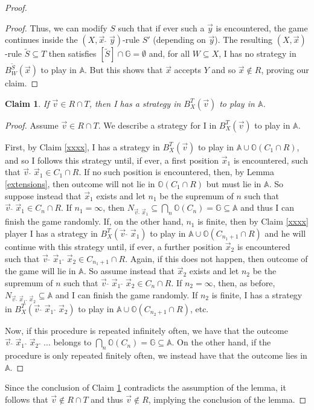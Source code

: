 \documentclass[10pt]{amsart}
\newcommand {\A}{\mathbb A}
\newcommand{\G}{\mathbb G}
\newcommand {\OO}{\mathbb O}
\newcommand{\con}{\;\hat{}\;}
\newcommand{\tom} {\emptyset}
\newtheorem{claim}[thm] {Claim}
\theoremstyle{definition}
\begin{document}
\begin{proof}
\begin{proof}
Thus, we can modify $S$ such that if ever such a $\vec y$ is encountered, the game continues inside the $(X,\vec x\con \vec y)$-rule $S'$ (depending on $\vec y$). The resulting $(X,\vec x)$-rule $\tilde S\subseteq T$
then satisfies $[\tilde S]\cap \G=\tom$ and, for all $W\subseteq X$,  I has no strategy in $B^{\tilde S}_W(\vec x)$ to play in $\A$. But this shows that $\vec x$ accepts $Y$ and so $\vec x\notin R$, proving our claim.
\end{proof}



\begin{claim}\label{xxxxx}
If $\vec v\in R\cap T$, then I has a strategy in $B^T_X(\vec v)$ to play in $\A$.
\end{claim}

\begin{proof}
Assume $\vec v\in R\cap T$. We describe a strategy for I in $B^T_X(\vec v)$ to play in $\A$. 

First, by Claim \ref{xxxx}, I has a strategy in $B^T_X(\vec v)$ to play in $\A\cup \OO(C_{1}\cap R)$, and so I follows this strategy until, if ever, a first position $\vec x_1$ is encountered, such that $\vec v\con \vec x_1\in C_1\cap R$.  If no such position is encountered, then, by Lemma \ref{extensions}, then outcome will not lie in $\OO(C_1\cap R)$ but must lie in $\A$. So suppose instead that $\vec x_1$ exists and let $n_1$ be the supremum of $n$ such that $\vec v\con \vec x_1\in C_n\cap R$. 
If $n_1=\infty$, then $N_{\vec v\con \vec x_1}\subseteq \bigcap_n\OO(C_n)=\G\subseteq \A$ and thus I can finish the game randomly. 
If, on the other hand,  $n_1$ is finite, then by Claim \ref{xxxx} player  I has a  strategy in $B^T_X(\vec v\con\vec x_1)$ to play in $\A\cup \OO(C_{n_1+1}\cap R)$ and he will continue with this strategy until, if ever, a further position $\vec x_2$ is encountered such that $\vec v\con \vec x_1\con \vec x_2\in C_{n_1+1}\cap R$. 
Again, if this does not happen, then outcome of the game will lie in $\A$. So assume instead that $\vec x_2$ exists and let $n_2$ be the supremum of $n$ such that $\vec v\con \vec x_1\con \vec x_2\in C_n\cap R$. 
If $n_2=\infty$, then,  as before, $N_{\vec v\con \vec x_1\con \vec x_2}\subseteq \A$ and I can finish the game randomly.
If $n_2$ is finite, I has a  strategy in $B^T_X(\vec v\con\vec x_1\con \vec x_2)$ to play in $\A\cup \OO(C_{n_2+1}\cap R)$, etc. 


 Now, if this procedure is repeated infinitely often, we have that the outcome $\vec v\con \vec x_1\con\vec x_2\con\ldots$ belongs to $\bigcap_n\OO(C_n)=\G\subseteq \A$. On the other hand, if the procedure is only repeated finitely often, we instead have that the outcome lies in $\A$.
\end{proof}
Since the conclusion of Claim \ref{xxxxx} contradicts the assumption of the lemma, it follows that $\vec v\notin R\cap T$ and thus $\vec v\notin R$, implying the conclusion of the lemma.
\end{proof}
\end{document}
